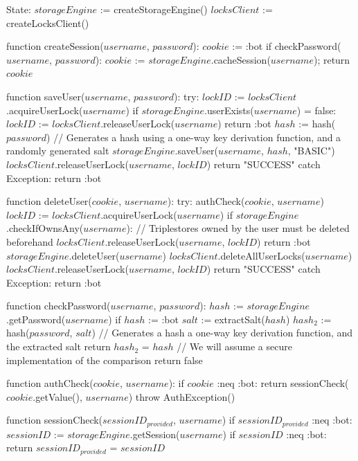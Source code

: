 State:
    $storageEngine$ := createStorageEngine()
    $locksClient$ := createLocksClient()

function createSession($username$, $password$):
    $cookie$ := :bot
    if checkPassword($username$, $password$):
        $cookie$ := $storageEngine$.cacheSession($username$);
    return $cookie$

function saveUser($username$, $password$):
    try:
        $lockID$ := $locksClient$.acquireUserLock($username$)
        if $storageEngine$.userExists($username$) = false:
            $lockID$ := $locksClient$.releaseUserLock($username$)
            return :bot
        $hash$ := hash($password$) // Generates a hash using a one-way key derivation function, and a randomly generated salt
        $storageEngine$.saveUser($username$, $hash$, "BASIC")
        $locksClient$.releaseUserLock($username$, $lockID$)
        return "SUCCESS"
    catch Exception:
        return :bot

function deleteUser($cookie$, $username$):
    try:
        authCheck($cookie$, $username$)
        $lockID$ := $locksClient$.acquireUserLock($username$)
        if $storageEngine$.checkIfOwnsAny($username$): // Triplestores owned by the user must be deleted beforehand
            $locksClient$.releaseUserLock($username$, $lockID$)
            return :bot
        $storageEngine$.deleteUser($username$)
        $locksClient$.deleteAllUserLocks($username$)
        $locksClient$.releaseUserLock($username$, $lockID$)
        return "SUCCESS"
    catch Exception:
        return :bot

function checkPassword($username$, $password$):
    $hash$ := $storageEngine$.getPassword($username$)
    if $hash$ := :bot
        $salt$ := extractSalt($hash$)
        $hash_2$ := hash($password$, $salt$) // Generates a hash a one-way key derivation function, and the extracted salt
        return $hash_2$ = $hash$ // We will assume a secure implementation of the comparison
    return false

function authCheck($cookie$, $username$):
    if $cookie$ :neq :bot:
        return sessionCheck($cookie$.getValue(), $username$)
    throw AuthException()

function sessionCheck($sessionID_{provided}$, $username$)
    if $sessionID_{provided}$ :neq :bot:
        $sessionID$ := $storageEngine$.getSession($username$)
        if $sessionID$ :neq :bot:
            return $sessionID_{provided}$ = $sessionID$